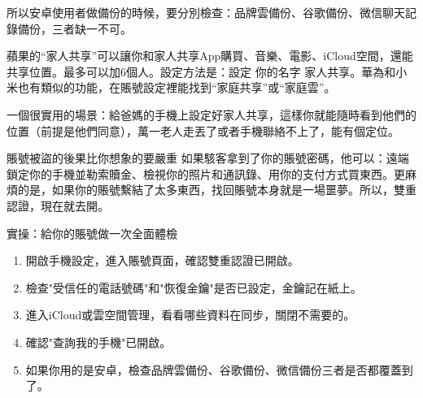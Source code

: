 所以安卓使用者做備份的時候，要分別檢查：品牌雲備份、谷歌備份、微信聊天記錄備份，三者缺一不可。


蘋果的“家人共享”可以讓你和家人共享App購買、音樂、電影、iCloud空間，還能共享位置。最多可以加6個人。設定方法是：設定 你的名字 家人共享。華為和小米也有類似的功能，在賬號設定裡能找到“家庭共享”或“家庭雲”。

一個很實用的場景：給爸媽的手機上設定好家人共享，這樣你就能隨時看到他們的位置（前提是他們同意），萬一老人走丟了或者手機聯絡不上了，能有個定位。

\begin{tcbwarn}{賬號被盜的後果比你想象的要嚴重}
如果駭客拿到了你的賬號密碼，他可以：遠端鎖定你的手機並勒索贖金、檢視你的照片和通訊錄、用你的支付方式買東西。更麻煩的是，如果你的賬號繫結了太多東西，找回賬號本身就是一場噩夢。所以，雙重認證，現在就去開。

\end{tcbwarn}

\begin{tcbpractice}{實操：給你的賬號做一次全面體檢}
\begin{enumerate}
  \item 開啟手機設定，進入賬號頁面，確認雙重認證已開啟。
  \item 檢查"受信任的電話號碼"和"恢復金鑰"是否已設定，金鑰記在紙上。
  \item 進入iCloud或雲空間管理，看看哪些資料在同步，關閉不需要的。
  \item 確認"查詢我的手機"已開啟。
  \item 如果你用的是安卓，檢查品牌雲備份、谷歌備份、微信備份三者是否都覆蓋到了。
\end{enumerate}

\end{tcbpractice}
